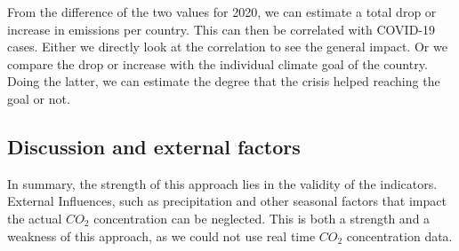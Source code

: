 From the difference of the two values for 2020, we can estimate a total drop or increase in emissions per country. This can then be correlated with COVID-19 cases. Either we directly look at the correlation to see the general impact. Or we compare the drop or increase with the individual climate goal of the country. Doing the latter, we can estimate the degree that the crisis helped reaching the goal or not.

\subsection{Discussion and external factors}

In summary, the strength of this approach lies in the validity of the indicators.
External Influences, such as precipitation and other seasonal factors that impact the actual $CO_2$ concentration can be neglected. This is both a strength and a weakness of this approach, as we could not use real time $CO_2$ concentration data.







